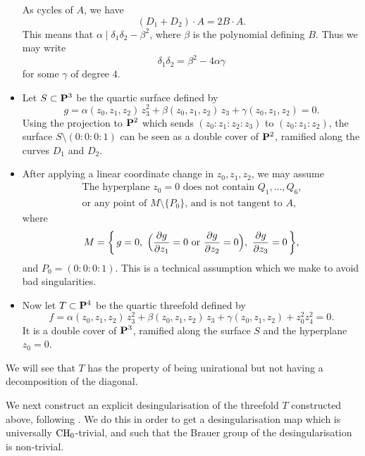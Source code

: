 \begin{itemize}
        As cycles of $A$, we have
        \[ (D_1 + D_2) \cdot A = 2B \cdot A. \]
        This means that $\alpha \mid \delta_1 \delta_2 - \beta^2$,
        where $\beta$ is the polynomial defining $B$. Thus we may write
        \[ \delta_1 \delta_2 = \beta^2 - 4 \alpha \gamma \]
        for some $\gamma$ of degree $4$.
    \item
        Let $S \subset \bbP^3$ be the quartic surface defined by
        \[ g = \alpha (z_0, z_1, z_2) \, z_3^2 + \beta (z_0, z_1, z_2) \, z_3
            + \gamma (z_0, z_1, z_2) = 0. \]
        Using the projection to $\bbP^2$ which sends $(z_0 : z_1 : z_2 : z_3)$ to $(z_0 : z_1 : z_2)$, 
        the surface $S \setminus (0:0:0:1)$ can be seen as a double cover of $\bbP^2$,
        ramified along the curves $D_1$ and $D_2$.
    \item
        After applying a linear coordinate change in $z_0, z_1, z_2$, we may assume
        \begin{multline} \label{eq-4-coord-change}
            \text{The hyperplane $z_0 = 0$ does not contain $Q_1, \dotsc, Q_6$,} \\
            \text{or any point of $M \setminus \{P_0\}$, and is not tangent to $A$,}
        \end{multline}
        where
        \[ M = \biggl\{ \, g = 0, \ \Bigl( 
            \frac {\partial g} {\partial z_1} = 0
            \ \text{or} \ 
            \frac {\partial g} {\partial z_2} = 0
        \Bigr),\ 
        \frac {\partial g} {\partial z_3} = 0 \, \biggr\}, \]
        and $P_0 = (0:0:0:1)$.
        This is a technical assumption
        which we make to avoid bad singularities.
    \item
        Now let $T \subset \bbP^4$ be the quartic threefold defined by
        \[ f = \alpha (z_0, z_1, z_2) \, z_3^2 + \beta (z_0, z_1, z_2) \, z_3
        + \gamma (z_0, z_1, z_2) + z_0^2 z_4^2 = 0. \]
        It is a double cover of $\bbP^3$,
        ramified along the surface $S$ and the hyperplane $z_0 = 0$.
\end{itemize}

We will see that $T$ has the property of
being unirational but not having a decomposition of the diagonal.


We next construct an explicit desingularisation of
the threefold $T$ constructed above,
following \cite[Appendix~A]{CTP}.
We do this in order to get a desingularisation map 
which is universally $\mathrm{CH}_0$-trivial,
and such that the Brauer group of the desingularisation is non-trivial.

